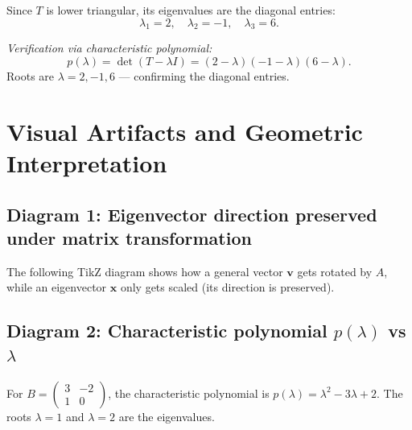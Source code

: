 \documentclass[12pt,a4paper]{article}
\begin{document}
Since $T$ is lower triangular, its eigenvalues are the diagonal entries:
\[
  \lambda_1 = 2, \quad \lambda_2 = -1, \quad \lambda_3 = 6.
\]

\textit{Verification via characteristic polynomial:}
\[
  p(\lambda) = \det(T - \lambda I)
  = (2-\lambda)(-1-\lambda)(6-\lambda).
\]
Roots are $\lambda = 2, -1, 6$ --- confirming the diagonal entries. \checkmark

\section{Visual Artifacts and Geometric Interpretation}

\subsection*{Diagram 1: Eigenvector direction preserved under matrix transformation}

The following TikZ diagram shows how a general vector $\mathbf{v}$ gets rotated by $A$,
while an eigenvector $\mathbf{x}$ only gets scaled (its direction is preserved).

\begin{center}
\end{center}

\subsection*{Diagram 2: Characteristic polynomial $p(\lambda)$ vs $\lambda$}

For $B = \begin{pmatrix}3&-2\\1&0\end{pmatrix}$, the characteristic polynomial is $p(\lambda)=\lambda^2-3\lambda+2$.
The roots $\lambda=1$ and $\lambda=2$ are the eigenvalues.
\end{document}
